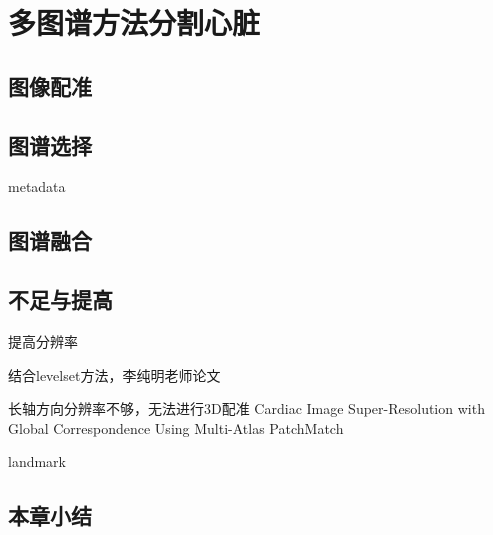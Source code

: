 
\chapter{多图谱方法分割心脏}

\section{图像配准}

\section{图谱选择}
metadata\par

\section{图谱融合}

\section{不足与提高}

提高分辨率

结合levelset方法，李纯明老师论文

长轴方向分辨率不够，无法进行3D配准
Cardiac Image Super-Resolution with Global Correspondence Using Multi-Atlas PatchMatch

landmark\par
\section{本章小结}
